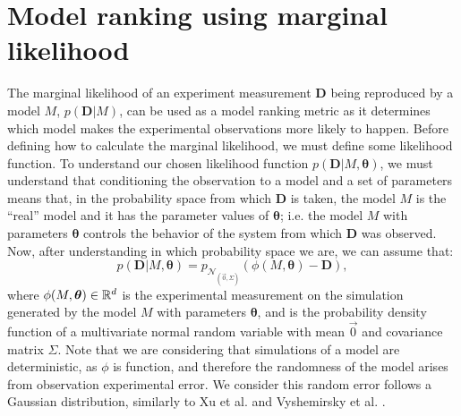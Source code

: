 \section{Model ranking using marginal likelihood}
\label{sec:marginal_likelihood_method}
The marginal likelihood of an experiment measurement ${\bm D}$ being 
reproduced by a model $M$, $p ({\bm D} | M)$, can be used as a model
ranking metric as it determines which model makes the experimental
observations more likely to happen. Before defining how to calculate the
marginal likelihood, we must define some likelihood function. To
understand our chosen likelihood function $p ({\bm D} | M, {\bm
\theta})$, we must understand that conditioning the observation to a
model and a set of parameters means that, in the probability space from
which ${\bm D}$ is taken, the model $M$ is the ``real'' model and it has
the parameter values of ${\bm \theta}$; i.e. the model $M$ with
parameters ${\bm \theta}$ controls the behavior of the system from
which ${\bm D}$ was observed. Now, after understanding in which
probability space we are, we can assume that: 
\begin{equation}
    p ({\bm D} | M,{\bm \theta}) = 
        p_{\mathcal{N}_{\left(\vec{0}, \Sigma\right)}}
        (\phi (M, {\bm\theta}) - {\bm D}),
\label{eq:likelihood_multivariate}
\end{equation}
where $\phi (M, {\bm \theta}) \in \mathbb{R}^d$ is the experimental 
measurement on the simulation generated by the model $M$ with parameters
${\bm \theta}$, and  is the probability density function of a multivariate normal 
random variable with mean $\vec{0}$ and covariance matrix $\Sigma$. Note
that we are considering that simulations of a model are deterministic,
as $\phi$ is function, and therefore the randomness of the model
arises from observation experimental error. We consider this random
error follows a Gaussian distribution, similarly to Xu et al. and Vyshemirsky et al.
\cite{Xura20,Vyshemirsky2007}.

